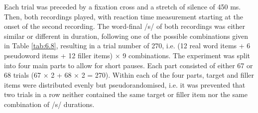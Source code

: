 Each trial was preceded by a fixation cross and a stretch of silence of 450 ms. Then, both recordings played, with reaction time measurement starting at the onset of the second recording. The word-final /s/ of both recordings was either similar or different in duration, following one of the possible combinations given in Table \ref{tab:6.8}, resulting in a trial number of 270, i.e. (12 real word items + 6 pseudoword items + 12 filler items) × 9 combinations. The experiment was split into four main parts to allow for short pauses. Each part consisted of either 67 or 68 trials 
(67 × 2 + 68 × 2 = 270). Within each of the four parts, target and filler items were distributed evenly but pseudorandomised, i.e. it was prevented that two trials in a row neither contained the same target or filler item nor the same combination of /s/ durations.

